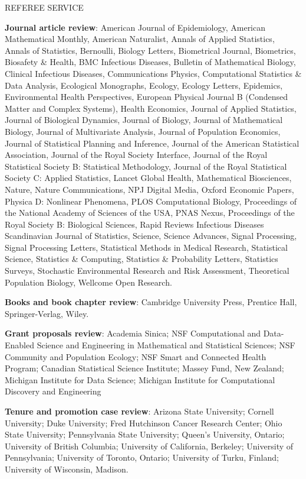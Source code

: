 \begin{mylist}{REFEREE SERVICE} %
\item {\bf Journal article review}: 
American Journal of Epidemiology,
American Mathematical Monthly,
American Naturalist,
Annals of Applied Statistics,
Annals of Statistics,
Bernoulli,
Biology Letters,
Biometrical Journal,
Biometrics,
Biosafety \& Health,
BMC Infectious Diseases,
Bulletin of Mathematical Biology,
Clinical Infectious Diseases,
Communications Physics,
Computational Statistics \& Data Analysis,
Ecological Monographs,
Ecology,
Ecology Letters,
Epidemics,
Environmental Health Perspectives,
European Physical Journal B (Condensed Matter and Complex Systems),
Health Economics,
Journal of Applied Statistics,
Journal of Biological Dynamics,
Journal of Biology,
Journal of Mathematical Biology,
Journal of Multivariate Analysis,
Journal of Population Economics,
Journal of Statistical Planning and Inference,
Journal of the American Statistical Association, 
Journal of the Royal Society Interface,  
Journal of the Royal Statistical Society B: Statistical Methodology,
Journal of the Royal Statistical Society C: Applied Statistics,
Lancet Global Health,
Mathematical Biosciences,
Nature,
Nature Communications,
NPJ Digital Media,
Oxford Economic Papers,
Physica D: Nonlinear Phenomena,
PLOS Computational Biology,
Proceedings of the National Academy of Sciences of the USA,
PNAS Nexus,
Proceedings of the Royal Society B: Biological Sciences,
Rapid Reviews Infectious Diseases
Scandinavian Journal of Statistics,
Science,
Science Advances,
Signal Processing,
Signal Processing Letters,
Statistical Methods in Medical Research,
Statistical Science,
Statistics \& Computing,
Statistics \& Probability Letters,
Statistics Surveys,
Stochastic Environmental Research and Risk Assessment,
Theoretical Population Biology,
Wellcome Open Research.

\item {\bf Books and book chapter review}:
Cambridge University Press, 
Prentice Hall,
 Springer-Verlag,  
 Wiley.

\item {\bf Grant proposals review}:
  Academia Sinica;
NSF Computational and Data-Enabled Science and Engineering in Mathematical and Statistical Sciences;
NSF Community and Population Ecology;
NSF Smart and Connected Health Program;
Canadian Statistical Science Institute;
Massey Fund, New Zealand;
Michigan Institute for Data Science;
Michigan Institute for Computational Discovery and Engineering

\item {\bf Tenure and promotion case review}:
Arizona State University;
Cornell University;
Duke University;
Fred Hutchinson Cancer Research Center;
Ohio State University;
Pennsylvania State University;
Queen's University, Ontario;
University of British Columbia;
University of California, Berkeley;
University of Pennsylvania;
University of Toronto, Ontario;
University of Turku, Finland;
University of Wisconsin, Madison.

\end{mylist}


